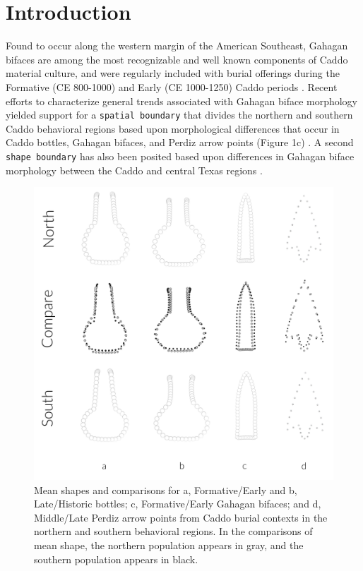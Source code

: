 \documentclass[]{interact}
\theoremstyle{plain}%
\theoremstyle{definition}
\theoremstyle{remark}
\begin{document}
\hypertarget{introduction}{%
\section{Introduction}\label{introduction}}

Found to occur along the western margin of the American Southeast,
Gahagan bifaces are among the most recognizable and well known
components of Caddo material culture, and were regularly included with
burial offerings during the Formative (CE 800-1000) and Early (CE
1000-1250) Caddo periods \citep{RN8186,RN8174,RN8176}. Recent efforts to
characterize general trends associated with Gahagan biface morphology
yielded support for a \texttt{spatial\ boundary} that divides the
northern and southern Caddo behavioral regions based upon morphological
differences that occur in Caddo bottles, Gahagan bifaces, and Perdiz
arrow points (Figure 1c) \citep{RN7925,RN8071,RN8361,RN8967,RN8154}. A
second \texttt{shape\ boundary} has also been posited based upon
differences in Gahagan biface morphology between the Caddo and central
Texas regions \citep{RN8318}.

\begin{figure}
\includegraphics[width=1\linewidth]{img/figure6} \caption{Mean shapes and comparisons for a, Formative/Early and b, Late/Historic bottles; c, Formative/Early Gahagan bifaces; and d, Middle/Late Perdiz arrow points from Caddo burial contexts in the northern and southern behavioral regions. In the comparisons of mean shape, the northern population appears in gray, and the southern population appears in black.}\label{fig:fig5}
\end{figure}
\end{document}
